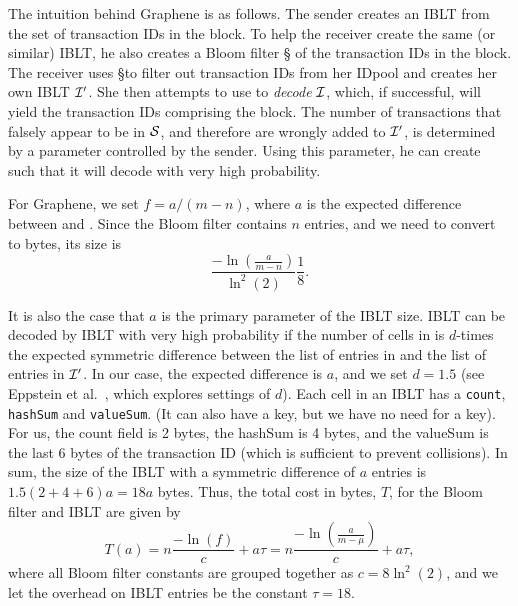 The intuition behind Graphene is as follows. The sender creates an IBLT \I
from the set of transaction IDs in the block. To help the receiver
create the same (or similar) IBLT, he also creates a Bloom filter \S
 of the transaction IDs in the block. The receiver uses \S to filter out
transaction IDs from her IDpool %
and creates her own IBLT $\cal{I}'$. She then attempts to use \Ip to \emph{decode} $\cal{I}$, which, if successful, will yield
the transaction IDs comprising the block. The number of transactions
that falsely appear to be in $\cal{S}$, and therefore are wrongly added to
$\cal{I}'$, is determined by a parameter controlled by the sender. Using
this parameter, he can
create \I such that it will decode with very high probability.  

For Graphene, we set $f=a/(m-n)$,
where $a$ is the expected difference between \I and \Ip .
Since the Bloom filter contains $n$ entries, and we need to convert to
bytes, its size is 
$$\frac{-\ln(\frac{a}{m-n})}{\ln^2(2)}\frac18. $$

It is also the case that $a$ is the primary parameter of the IBLT
size.  IBLT \I can be decoded by IBLT \Ip with very high probability
if the number of cells in \I is $d$-times the expected symmetric
difference between the list of entries in \I and the list of entries
in $\cal{I}'$. In our case, the expected difference is $a$, and we set
$d=1.5$ (see Eppstein et al.~\cite{eppstein:2011}, which explores
settings of $d$). Each cell in an IBLT has a {\tt count}, {\tt hashSum} and
{\tt valueSum}.
(It can also have a key, but we have
no need for a key). For us, the count field is 2 bytes, the
hashSum is 4 bytes, and the valueSum is the last 6 bytes of the
transaction ID (which is sufficient to prevent collisions). In sum,
the size of the IBLT with a symmetric difference of $a$ entries is
$1.5(2+4+6)a=18a$ bytes.
Thus, the total cost in bytes, $T$, for the Bloom filter and IBLT are
given by 
$$T(a)= n\frac{-\ln(f)}{c}+ a\tau = n\frac{-\ln(\frac{a}{m-\mu})}{c}+ a\tau,$$ 
where all Bloom filter constants are grouped together as
$c=8\ln^2(2)$, and we let the overhead on IBLT entries be the constant
$\tau=18$.

